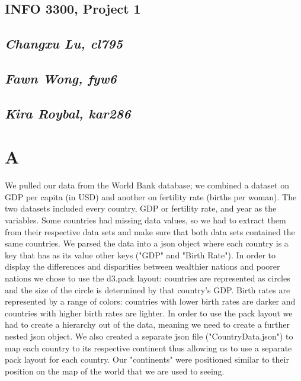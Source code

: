 \documentclass[12pt]{article}
\begin{document}
\begin{center}
\section*{INFO 3300, Project 1}
\subsection*{\textit{Changxu Lu, cl795}}
\subsection*{\textit{Fawn Wong, fyw6}}
\subsection*{\textit{Kira Roybal, kar286}}
\end{center}

\section*{A}
We pulled our data from the World Bank database; we combined a dataset on GDP per capita (in USD) and
another on fertility rate (births per woman). The two datasets included every country, GDP or fertility
rate, and year as the variables. Some countries had missing data values, so we had to extract them from
their respective data sets and make sure that both data sets contained the same countries. We parsed the
data into a json object where each country is a key that has as its value other keys ("GDP" and "Birth
Rate"). In order to display the differences and disparities between wealthier nations and poorer nations
we chose to use the d3.pack layout: countries are represented as circles and the size of the circle is
determined by that country's GDP. Birth rates are represented by a range of colors: countries with lower
birth rates are darker and countries with higher birth rates are lighter. In order to use the pack
layout we had to create a hierarchy out of the data, meaning we need to create a further nested json
object. We also created a separate json file ("CountryData.json") to map each country to its respective
continent thus allowing us to use a separate pack layout for each country. Our "continents" were positioned similar to their position on the map of the world that we are used to seeing.
\end{document}
